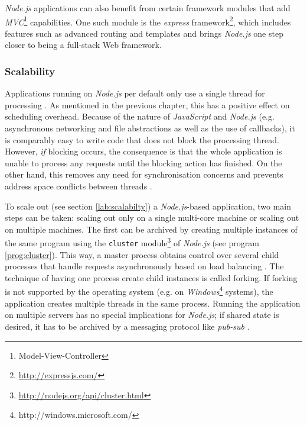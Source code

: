 \textit{Node.js} applications can also benefit from certain framework modules that add \textit{MVC}\footnote{Model-View-Controller} capabilities. One such module is the \textit{express} framework\footnote{\url{http://expressjs.com/}}, which includes features such as advanced routing and templates and brings \textit{Node.js} one step closer to being a full-stack Web framework.

\subsubsection*{Scalability}
Applications running on \textit{Node.js} per default only use a single thread for processing \cite{node-loop}. As mentioned in the previous chapter, this has a positive effect on scheduling overhead. Because of the nature of \textit{JavaScript} and \textit{Node.js} (e.g. asynchronous networking and file abstractions as well as the use of callbacks), it is comparably easy to write code that does not block the processing thread. However, \textit{if} blocking occurs, the consequence is that the whole application is unable to process any requests until the blocking action has finished. On the other hand, this removes any need for synchronisation concerns and prevents address space conflicts between threads \cite[p. 105]{Erb2012}.

To scale out (see section \ref{lab:scalabilty}) a \textit{Node.js}-based application, two main steps can be taken: scaling out only on a single multi-core machine or scaling out on multiple machines. The first can be archived by creating multiple instances of the same program using the \texttt{cluster} module\footnote{\url{http://nodejs.org/api/cluster.html}} of \textit{Node.js} (see program \ref{prog:cluster}). This way, a master process obtains control over several child processes that handle requests asynchronously based on load balancing \cite[p. 64]{Hughes-Croucher2012}. The technique of having one process create child instances is called forking. If forking is not supported by the operating system (e.g. on \textit{Windows}\footnote{http://windows.microsoft.com/} systems), the application creates multiple threads in the same process. Running the application on multiple servers has no special implications for \textit{Node.js}; if shared state is desired, it has to be archived by a messaging protocol like \textit{pub-sub} \cite[p. 137]{Hughes-Croucher2012}.

